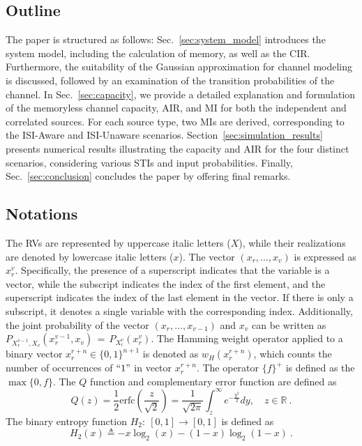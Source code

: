 \documentclass[journal]{IEEEtranTCOM}
\begin{document}
\subsection{Outline}
\par The paper is structured as follows: Sec.~\ref{sec:system_model} introduces the system model, including the calculation of memory, as well as the CIR. Furthermore, the suitability of the Gaussian approximation for channel modeling is discussed, followed by an examination of the transition probabilities of the channel. In Sec.~\ref{sec:capacity}, we provide a detailed explanation and formulation of the memoryless channel capacity, AIR, and MI for both the independent and correlated sources. For each source type, two MIs are derived, corresponding to the ISI-Aware and ISI-Unaware scenarios. Section~\ref{sec:simulation_results} presents numerical results illustrating the capacity and AIR for the four distinct scenarios, considering various STIs and input probabilities. Finally, Sec.~\ref{sec:conclusion} concludes the paper by offering final remarks.
\subsection{Notations}
\par 
The RVs are represented by uppercase italic letters ($X$), while their realizations are denoted by lowercase italic letters ($x$). The vector $(x_{r},\ldots,x_{v})$ is expressed as $x_{r}^{v}$. Specifically, the presence of a superscript indicates that the variable is a vector, while the subscript indicates the index of the first element, and the superscript indicates the index of the last element in the vector. If there is only a subscript, it denotes a single variable with the corresponding index. Additionally, the joint probability of the vector $(x_{r},\ldots,x_{v-1})$ and $x_{v}$ can be written as $P_{X_{r}^{v-1},X_{v}}(x_{r}^{v-1},x_{v})$$\,=\,$$P_{X_{r}^{v}}(x_{r}^{v})$. The Hamming weight operator applied to a binary vector $x_{r}^{r+n}\in\{0,1\}^{n+1}$ is denoted as $w_{H}(x_{r}^{r+n})$, which counts the number of occurrences of $``1"$ in vector $x_{r}^{r+n}$. The operator $\{f\}^{+}$ is defined as the $\max \{0,f\}$. The $Q$ function and complementary error function are defined as
\begin{equation}
    Q(z) = \frac{1}{2}\mathrm{erfc}\left ( \frac{z}{\sqrt{2}} \right )= \frac{1}{\sqrt{2\pi}}\int_{z}^{\infty} e^{-\frac{y^2}{2}}dy, \quad z \in \mathbb{R}~.
\end{equation}
The binary entropy function $H_{2}:\: [0,1] \rightarrow [0,1]$ is defined as
\begin{equation}
    H_{2}(x) \triangleq -x\log_{2}(x)-(1-x)\log_{2}(1-x)~.
\end{equation}
\end{document}
